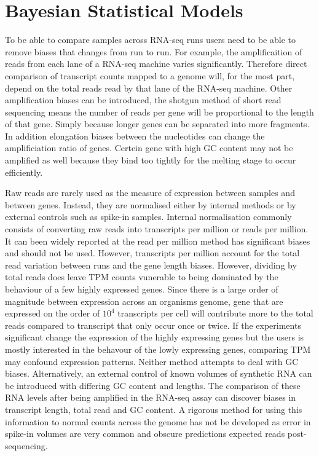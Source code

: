 \documentclass{SBCbookchapter}
\begin{document}
\section{Bayesian Statistical Models}

To be able to compare samples across RNA-seq runs users need to be able to remove biases that changes from run to run. For example, the amplificaition of reads from each lane of a RNA-seq machine varies significantly. Therefore direct comparison of transcript counts mapped to a genome will, for the most part, depend on the total reads read by that lane of the RNA-seq machine.  Other amplification biases can be introduced, the shotgun method of short read sequencing means the number of reads per gene will be proportional to the length of that gene. Simply because longer genes can be separated into more fragments. In addition elongation biases between the nucleotides can change the amplificiation ratio of genes. Certein gene with high GC content may not be amplified as well because they bind too tightly for the melting stage to occur efficiently. 

Raw reads are rarely used as the measure of expression between samples and between genes. Instead, they are normalised either by internal methods or by external controls such as spike-in samples. Internal normalisation commonly consists of converting raw reads into transcripts per million or reads per million. It can been widely reported at the read per million method has significant biases and should not be used. However, transcripts per million account for the total read variation between runs and the gene length biases. However, dividing by total reads does leave TPM counts vunerable to being dominated by the behaviour of a few highly expressed genes. Since there is a large order of magnitude between expression across an organisms genome, gene that are expressed on the order of $10^4$ transcripts per cell will contribute more to the total reads compared to transcript that only occur once or twice. If the experiments significant change the expression of the highly expressing genes but the users is mostly interested in the behavour of the lowly expressing genes, comparing TPM may confound expression patterns. Neither method attempts to deal with GC biases. Alternatively, an external control of known volumes of synthetic RNA can be introduced with differing GC content and lengths. The comparison of these RNA levels after being amplified in the RNA-seq assay can discover biases in transcript length, total read and GC content. A rigorous method for using this information to normal counts across the genome has not be developed as error in spike-in volumes are very common and obscure predictions expected reads post-sequencing.
\end{document}
